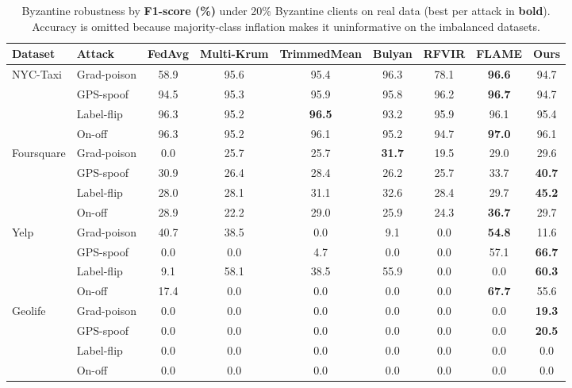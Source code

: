 \begin{table}[t]\centering\small
\caption{Byzantine robustness by \textbf{F1-score (\%)} under 20\% Byzantine clients on real data (best per attack in \textbf{bold}). Accuracy is omitted because majority-class inflation makes it uninformative on the imbalanced datasets.}
\label{tab:baselines_f1}
\begin{tabular}{llccccccc}
\toprule
Dataset & Attack & FedAvg & Multi-Krum & TrimmedMean & Bulyan & RFVIR & FLAME & Ours \\
\midrule
NYC-Taxi & Grad-poison & 58.9 & 95.6 & 95.4 & 96.3 & 78.1 & \textbf{96.6} & 94.7 \\
 & GPS-spoof & 94.5 & 95.3 & 95.9 & 95.8 & 96.2 & \textbf{96.7} & 94.7 \\
 & Label-flip & 96.3 & 95.2 & \textbf{96.5} & 93.2 & 95.9 & 96.1 & 95.4 \\
 & On-off & 96.3 & 95.2 & 96.1 & 95.2 & 94.7 & \textbf{97.0} & 96.1 \\
\midrule
Foursquare & Grad-poison & 0.0 & 25.7 & 25.7 & \textbf{31.7} & 19.5 & 29.0 & 29.6 \\
 & GPS-spoof & 30.9 & 26.4 & 28.4 & 26.2 & 25.7 & 33.7 & \textbf{40.7} \\
 & Label-flip & 28.0 & 28.1 & 31.1 & 32.6 & 28.4 & 29.7 & \textbf{45.2} \\
 & On-off & 28.9 & 22.2 & 29.0 & 25.9 & 24.3 & \textbf{36.7} & 29.7 \\
\midrule
Yelp & Grad-poison & 40.7 & 38.5 & 0.0 & 9.1 & 0.0 & \textbf{54.8} & 11.6 \\
 & GPS-spoof & 0.0 & 0.0 & 4.7 & 0.0 & 0.0 & 57.1 & \textbf{66.7} \\
 & Label-flip & 9.1 & 58.1 & 38.5 & 55.9 & 0.0 & 0.0 & \textbf{60.3} \\
 & On-off & 17.4 & 0.0 & 0.0 & 0.0 & 0.0 & \textbf{67.7} & 55.6 \\
\midrule
Geolife & Grad-poison & 0.0 & 0.0 & 0.0 & 0.0 & 0.0 & 0.0 & \textbf{19.3} \\
 & GPS-spoof & 0.0 & 0.0 & 0.0 & 0.0 & 0.0 & 0.0 & \textbf{20.5} \\
 & Label-flip & 0.0 & 0.0 & 0.0 & 0.0 & 0.0 & 0.0 & 0.0 \\
 & On-off & 0.0 & 0.0 & 0.0 & 0.0 & 0.0 & 0.0 & 0.0 \\
\bottomrule
\end{tabular}
\end{table}
